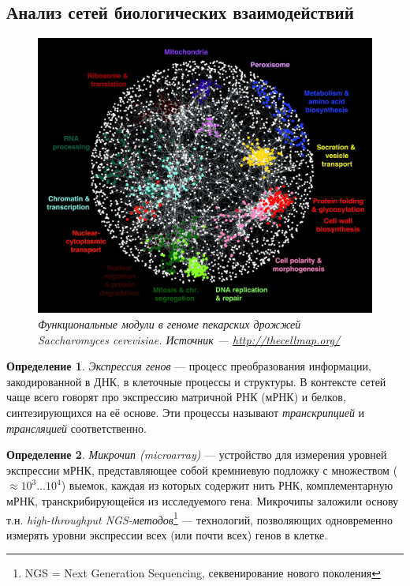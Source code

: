 \documentclass[11pt,a4paper]{report}
\theoremstyle{definition}
\theoremstyle{definition}
\theoremstyle{definition}
\newtheorem{definition}{Определение}[section]
\begin{document}
	\subsection{Анализ сетей биологических взаимодействий}
		\begin{figure}[!hbtp]
		\includegraphics[width=\textwidth]{./img/yeast_interactome.jpg}
		\caption{\textit{Функциональные модули в геноме пекарских дрожжей Saccharomyces cerevisiae. \newline Источник — \href{http://thecellmap.org/}{http://thecellmap.org/}}}
	\end{figure}
	\begin{definition}
		\textit{Экспрессия генов} — процесс преобразования информации, закодированной в ДНК, в клеточные процессы и структуры. В контексте сетей чаще всего говорят про экспрессию матричной РНК (мРНК) и белков, синтезирующихся на её основе. Эти процессы называют \textit{транскрипцией} и \textit{трансляцией} соответственно.
	\end{definition}
	\begin{definition}
		\textit{Микрочип (microarray)} — устройство для измерения уровней экспрессии мРНК, представляющее собой кремниевую подложку с множеством ($\approx 10^3\ldots10^4$) выемок, каждая из которых содержит нить РНК, комплементарную мРНК, транскрибирующейся из исследуемого гена. Микрочипы заложили основу т.н. \textit{high-throughput NGS-методов}\footnote{NGS = Next Generation Sequencing, секвенирование нового поколения} — технологий, позволяющих одновременно измерять уровни экспрессии всех (или почти всех) генов в клетке.  
	\end{definition}
\end{document}
